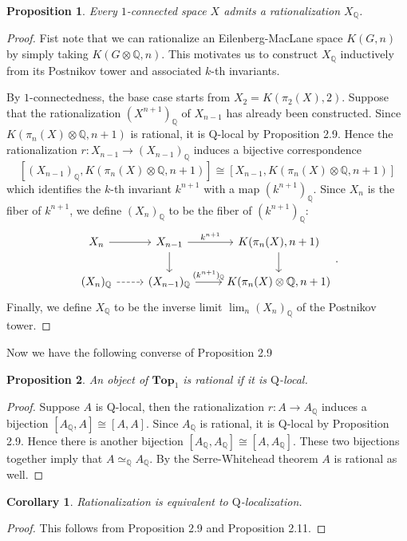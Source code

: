 \documentclass[psamsfonts]{amsart}
\newtheorem{cor}{Corollary}[section]
\newtheorem{prop}{Proposition}[section]
\theoremstyle{definition}
\newcommand{\Q}{\mathbb{Q}}
\newcommand{\Top}{\mathbf{Top}}
\numberwithin{equation}{section}
\begin{document}
\begin{prop}
Every $1$-connected space $X$ admits a rationalization $X_\Q$.
\end{prop}
\begin{proof}
Fist note that we can rationalize an Eilenberg-MacLane space $K(G,n)$ by simply taking $K(G\otimes\Q,n)$. This motivates us to construct $X_\Q$ inductively from its Postnikov tower and associated $k$-th invariants.

By $1$-connectedness, the base case starts from $X_2=K(\pi_2(X),2)$. Suppose that the rationalization $(X^{n+1})_\Q$ of $X_{n-1}$ has already been constructed. Since $K(\pi_n(X)\otimes\Q,n+1)$ is rational, it is $\mathrm{Q}$-local by Proposition 2.9. Hence the rationalization $r:X_{n-1}\to(X_{n-1})_\Q$ induces a bijective correspondence
\[[(X_{n-1})_\Q,K(\pi_n(X)\otimes\Q,n+1)]\cong[X_{n-1},K(\pi_n(X)\otimes\Q,n+1)]\]
which identifies the $k$-th invariant $k^{n+1}$ with a map $(k^{n+1})_\Q$. Since $X_n$ is the fiber of $k^{n+1}$, we define $(X_n)_\Q$ to be the fiber of $(k^{n+1})_\Q$:
\[\begin{tikzcd}
X_n\arrow[r]&X_{n-1}\arrow[d]\arrow[r,"k^{n+1}"]&K(\pi_n(X),n+1)\arrow[d]\\
(X_n)_\Q\arrow[r,dashed]&(X_{n-1})_\Q\arrow[r,"(k^{n+1})_\Q"]&K(\pi_n(X)\otimes\Q,n+1)
\end{tikzcd}.\]
Finally, we define $X_\Q$ to be the inverse limit $\lim_n(X_n)_\Q$ of the Postnikov tower.
\end{proof}

Now we have the following converse of Proposition 2.9

\begin{prop}
An object of $\Top_1$ is rational if it is $\mathrm{Q}$-local.
\end{prop}
\begin{proof}
Suppose $A$ is $\mathrm{Q}$-local, then the rationalization $r:A\to A_\Q$ induces a bijection $[A_\Q,A]\cong[A,A]$. Since $A_\Q$ is rational, it is $\mathrm{Q}$-local by Proposition 2.9. Hence there is another bijection $[A_\Q,A_\Q]\cong[A,A_\Q]$. These two bijections together imply that $A\simeq_\Q A_\Q$. By the Serre-Whitehead theorem $A$ is rational as well.
\end{proof}

\begin{cor}
Rationalization is equivalent to $\mathrm{Q}$-localization.
\end{cor}
\begin{proof}
This follows from Proposition 2.9 and Proposition 2.11.
\end{proof}
\end{document}
